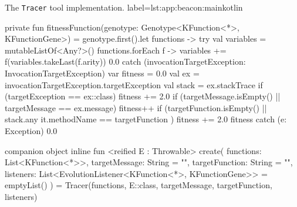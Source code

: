 \begin{code}{%
    The \texttt{Tracer} tool implementation.
}{label=lst:app:beacon:main}{kotlin}
{        private fun fitnessFunction(genotype: Genotype<KFunction<*>, KFunctionGene>) = 
            genotype.first().let { functions ->
                try {
                    val variables = mutableListOf<Any?>()
                    functions.forEach { f ->
                        variables += f(variables.takeLast(f.arity))
                    }
                    0.0
                } catch (invocationTargetException: InvocationTargetException) {
                    var fitness = 0.0
                    val ex = invocationTargetException.targetException
                    val stack = ex.stackTrace
                    if (targetException == ex::class) {
                        fitness += 2.0
                        if (targetMessage.isEmpty() || targetMessage == ex.message) {
                            fitness++
                        }
                    }
                    if (targetFunction.isEmpty() 
                        || stack.any { it.methodName == targetFunction }) {
                        fitness += 2.0
                    }
                    fitness
                } catch (e: Exception) {
                    0.0
                }
            }

        companion object {
            inline fun <reified E : Throwable> create(
                functions: List<KFunction<*>>,
                targetMessage: String = "",
                targetFunction: String = "",
                listeners: List<EvolutionListener<KFunction<*>, KFunctionGene>> = emptyList()
            ) = Tracer(functions, E::class, targetMessage, targetFunction, listeners)
        }
    }
\end{code}